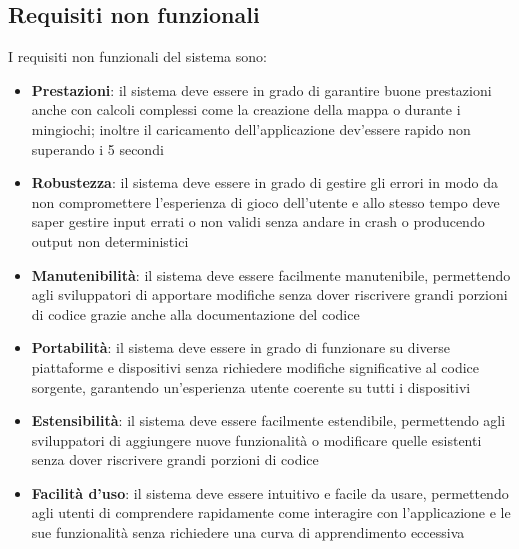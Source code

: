 \subsection{Requisiti non funzionali} \label{subsec:non_functional_requirements}
I requisiti non funzionali del sistema sono:
\begin{itemize}
    \item \textbf{Prestazioni}: il sistema deve essere in grado di garantire buone prestazioni anche con calcoli
    complessi come la creazione della mappa o durante i mingiochi; inoltre il caricamento dell'applicazione dev'essere rapido 
    non superando i 5 secondi
    \item \textbf{Robustezza}: il sistema deve essere in grado di gestire gli errori in modo da non compromettere
    l'esperienza di gioco dell'utente e allo stesso tempo deve saper gestire input errati o non validi senza andare in crash
    o producendo output non deterministici
    \item \textbf{Manutenibilità}: il sistema deve essere facilmente manutenibile, permettendo agli sviluppatori
    di apportare modifiche senza dover riscrivere grandi porzioni di codice grazie anche alla documentazione del codice
    \item \textbf{Portabilità}: il sistema deve essere in grado di funzionare su diverse piattaforme e dispositivi senza richiedere
    modifiche significative al codice sorgente, garantendo un'esperienza utente coerente su tutti i dispositivi
    \item \textbf{Estensibilità}: il sistema deve essere facilmente estendibile, permettendo agli sviluppatori di aggiungere
    nuove funzionalità o modificare quelle esistenti senza dover riscrivere grandi porzioni di codice
    \item \textbf{Facilità d'uso}: il sistema deve essere intuitivo e facile da usare, permettendo agli utenti di comprendere
    rapidamente come interagire con l'applicazione e le sue funzionalità senza richiedere una curva di apprendimento eccessiva
\end{itemize}